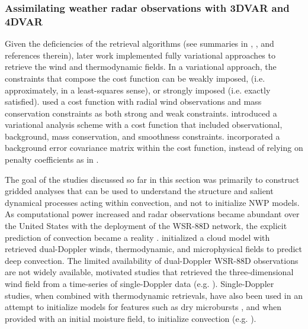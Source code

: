 \subsubsection{Assimilating weather radar observations with 3DVAR and 4DVAR}
Given the deficiencies of the retrieval algorithms (see summaries in \citealt{shapiromewes99}, \citealt{gaoetal99}, and references therein), later work implemented fully variational approaches to retrieve the wind and thermodynamic fields. In a variational approach, the constraints that compose the cost function can be weakly imposed, (i.e. approximately, in a least-squares sense), or strongly imposed (i.e. exactly satisfied). \citet{shapiromewes99} used a cost function with radial wind observations and mass conservation constraints as both strong and weak constraints. \citet{gaoetal99} introduced a variational analysis scheme with a cost function that included observational, background, mass conservation, and smoothness constraints. \citet{gaoetal04} incorporated a background error covariance matrix within the cost function, instead of relying on penalty coefficients as in \citet{gaoetal99}.

The goal of the studies discussed so far in this section was primarily to construct gridded analyses that can be used to understand the structure and salient dynamical processes acting within convection, and not to initialize NWP models. As computational power increased and radar observations became abundant over the United States with the deployment of the WSR-88D network, the explicit prediction of convection became a reality \citep{lilly90}. \citet{linetal93} initialized a cloud model with retrieved dual-Doppler winds, thermodynamic, and microphysical fields to predict deep convection. The limited availability of dual-Doppler WSR-88D observations are not widely available, motivated studies that retrieved the three-dimensional wind field from a time-series of single-Doppler data (e.g. \citealt{shapiroetal95,gaoetal01}). Single-Doppler studies, when combined with thermodynamic retrievals, have also been used in an attempt to initialize models for features such as dry microbursts \citep{crooktuttle94}, and when provided with an initial moisture field, to initialize convection (e.g. \citealt{weygandtetal02a}).

